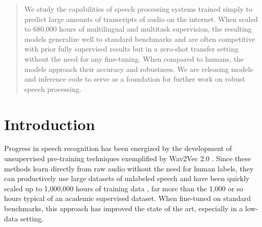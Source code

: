 \documentclass[nohyperref]{article}
\theoremstyle{plain}
\theoremstyle{definition}
\theoremstyle{remark}
\begin{document}





\printAffiliationsAndNotice{\icmlEqualContribution} 

\begin{abstract}
We study the capabilities of speech processing systems trained simply to predict large amounts of transcripts of audio on the internet. When scaled to 680,000 hours of multilingual and multitask supervision, the resulting models generalize well to standard benchmarks and are often competitive with prior fully supervised results but in a zero-shot transfer setting without the need for any fine-tuning. When compared to humans, the models approach their accuracy and robustness. We are releasing models and inference code to serve as a foundation for further work on robust speech processing.
\end{abstract}

\section{Introduction}\label{sec:introduction}

Progress in speech recognition has been energized by the development of unsupervised pre-training techniques exemplified by Wav2Vec 2.0 \cite{baevski2020wav2vec2}. Since these methods learn directly from raw audio without the need for human labels, they can productively use large datasets of unlabeled speech and have been quickly scaled up to 1,000,000 hours of training data \cite{zhang2021bigssl}, far more than the 1,000 or so hours typical of an academic supervised dataset. When fine-tuned on standard benchmarks, this approach has improved the state of the art, especially in a low-data setting.
\end{document}
